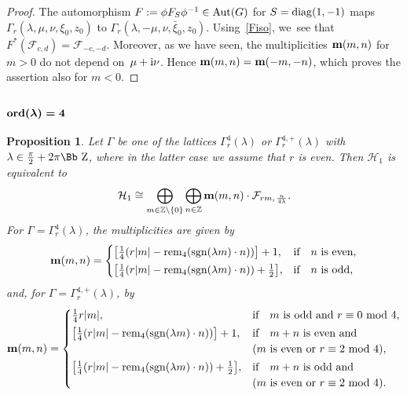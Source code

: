 \documentclass[pdftex]{sigma}
\newcommand\ZZ{{\mbox{\Bb Z}}}
\newcommand\Z{{\mathbb Z}}
\newcommand\bm{\textbf{{\rm \textbf{m}}}}
\newcommand\cH{{\mathcal H}}
\newcommand\cF{{\mathcal F}}
\newcommand{\Aut}{\mathop{{\rm Aut}}}
\newcommand{\sgn}{\mathop{{\rm sgn}}}
\newcommand{\diag}{\mathop{{\rm diag}}}
\newcommand{\rem}{\mathop{{\rm rem}}}
\newcommand{\ord}{{\rm ord}}
\numberwithin{equation}{section}
\newtheorem{Proposition}[Theorem]{Proposition}
 { \theoremstyle{definition}
\newtheorem{Definition}[Theorem]{Definition}
\newtheorem{Note}[Theorem]{Note}
\newtheorem{Example}[Theorem]{Example}
\newtheorem{Remark}[Theorem]{Remark} }
\begin{document}
\begin{proof}
The automorphism $F:=\phi F_{S}\phi^{-1}\in \Aut(G)$ for $S=\diag(1,-1)$ maps $\Gamma_r(\lambda,\mu,\nu,\xi_0,z_0)$ to $\Gamma_r(\lambda,-\mu,\nu,\bar\xi_0,z_0)$. Using~\eqref{Fiso}, we~see that $F^*(\cF_{c,d})=\cF_{-c,-d}$. Moreover, as we have seen, the multiplicities $\bm(m,n)$ for $m>0$ do not depend on~$\mu+{\rm i}\nu$. Hence $\bm(m,n)=\bm(-m,-n)$, which proves the assertion also for $m<0$.
\end{proof}



\subsubsection[$\ord(\lambda)=4$]{$\boldsymbol{\ord(\lambda)=4}$}

\begin{Proposition} \label{P12} Let $\Gamma$ be one of the lattices $\Gamma_r^4(\lambda)$ or $\Gamma_r^{4,+}(\lambda)$ with $\lambda\in\frac\pi2+2\pi\ZZ$, where in the latter case we assume that $r$ is even. Then $\cH_1$ is equivalent to
\begin{gather*}
\cH_1\cong\bigoplus_{m\in \Z\backslash\{0\}} \bigoplus_{n\in\Z} \bm(m,n)\cdot \cF_{rm,\,\frac n{4\lambda}}.
\end{gather*}
For $\Gamma=\Gamma_r^4(\lambda)$, the multiplicities are given by
\begin{gather*}
\bm(m,n) =\begin{cases}
\big[\frac14(r|m|-\rem_4(\sgn(\lambda m)\cdot n))\big]+1,& \text{if\quad $n$ is even},
\\[.5ex]
\big[\frac14(r|m|-\rem_4(\sgn(\lambda m)\cdot n))+\frac12\big],& \text{if\quad $n$ is odd},
\end{cases}
\end{gather*}
and, for $\Gamma=\Gamma_r^{4,+}(\lambda)$, by
\begin{gather*}
\bm(m,n) =\begin{cases}
\frac14 r|m|,& \text{if\quad $m$ is odd and $r\equiv 0\ {\rm mod}\ 4$},
\\[.5ex]
\big[\frac14(r|m|-\rem_4(\sgn(\lambda m)\cdot n))\big]+1,& \text{if\quad $m+n$ is even and}
\\
& (m \mbox{ is even or } r\equiv 2\ {\rm mod}\ 4),
\\[.5ex]
\big[\frac14(r|m|-\rem_4(\sgn(\lambda m)\cdot n))+\frac12\big],& \text{if\quad $m+n$ is odd and}
\\
& (m \mbox{ is even or } r\equiv 2\ {\rm mod}\ 4).
\end{cases}
\end{gather*}
\end{Proposition}
\end{document}

